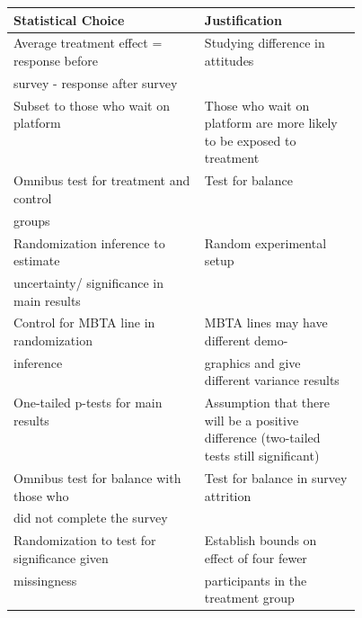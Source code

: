 \documentclass[10pt,landscape]{article}
\begin{document}
\begin{multicols*}{2}
\begin{center}
   \begin{tabular}{|l|p{0.45\linewidth}|} \hline
   \textbf{Statistical Choice} & \textbf{Justification} \\\hline
   Average treatment effect = response before & Studying difference in attitudes\\
   survey - response after survey & \\\hline
   Subset to those who wait on platform & Those who wait on platform are more likely to be exposed to treatment \\\hline
   Omnibus test for treatment and control & Test for balance \\
   groups & \\\hline
   Randomization inference to estimate & Random experimental setup \\
   uncertainty/ significance in main results & \\\hline
   Control for MBTA line in randomization & MBTA lines may have different demo- \\
   inference & graphics and give different variance results \\\hline
   One-tailed p-tests for main results & Assumption that there will be a positive difference (two-tailed tests still significant) \\\hline
   Omnibus test for balance with those who & Test for balance in survey attrition \\
   did not complete the survey & \\\hline
   Randomization to test for significance given & Establish bounds on effect of four fewer \\
   missingness & participants in the treatment group \\\hline
   
   \end{tabular}
   \end{center}

\end{multicols*}
\end{document}
